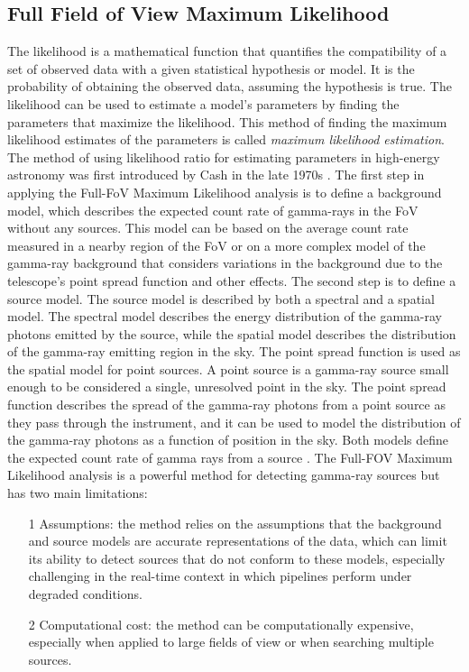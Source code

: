 \subsection{Full Field of View Maximum Likelihood}
\label{ss:ffov-ml}
The likelihood is a mathematical function that quantifies the compatibility of a set of observed data with a given statistical hypothesis or model. It is the probability of obtaining the observed data, assuming the hypothesis is true. The likelihood can be used to estimate a model's parameters by finding the parameters that maximize the likelihood. This method of finding the maximum likelihood estimates of the parameters is called \textit{maximum likelihood estimation}. The method of using likelihood ratio for estimating parameters in high-energy astronomy was first introduced by Cash in the late 1970s \cite{cash_1979}. The first step in applying the Full-FoV Maximum Likelihood analysis is to define a background model, which describes the expected count rate of gamma-rays in the FoV without any sources. This model can be based on the average count rate measured in a nearby region of the FoV or on a more complex model of the gamma-ray background that considers variations in the background due to the telescope's point spread function and other effects. The second step is to define a source model. The source model is described 
by both a spectral and a spatial model. The spectral model describes the energy distribution of the gamma-ray photons emitted by the source, while the spatial model describes the distribution of the gamma-ray emitting region in the sky. The point spread function is used as the spatial model for point sources. A point source is a gamma-ray source small enough to be considered a single, unresolved point in the sky. The point spread function describes the spread of the gamma-ray photons from a point source as they pass through the instrument, and it can be used to model the distribution of the gamma-ray photons as a function of position in the sky. Both models define the expected count rate of gamma rays from a source \cite{di2020detection}.  The Full-FOV Maximum Likelihood analysis is a powerful method for detecting gamma-ray sources but has two main limitations:
\begin{itemize}
    \item[1] Assumptions: the method relies on the assumptions that the background and source models are accurate representations of the data, which can limit its ability to detect sources that do not conform to these models, especially challenging in the real-time context in which pipelines perform under degraded conditions.
    \item[2] Computational cost: the method can be computationally expensive, especially when applied to large fields of view or when searching multiple sources.
\end{itemize}

